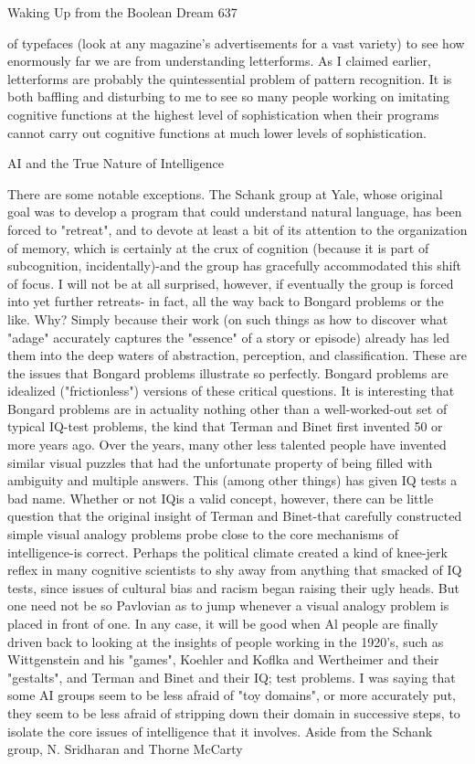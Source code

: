 Waking Up from the Boolean Dream                                                    637

of typefaces (look at any magazine's advertisements for a vast variety) to see how
enormously far we are from understanding letterforms. As I claimed earlier,
letterforms are probably the quintessential problem of pattern recognition. It is both
baffling and disturbing to me to see so many people working on imitating cognitive
functions at the highest level of sophistication when their programs cannot carry out
cognitive functions at much lower levels of sophistication.

                       AI and the True Nature of Intelligence

         There are some notable exceptions. The Schank group at Yale, whose original
goal was to develop a program that could understand natural language, has been
forced to "retreat", and to devote at least a bit of its attention to the organization of
memory, which is certainly at the crux of cognition (because it is part of subcognition,
incidentally)-and the group has gracefully accommodated this shift of focus. I will not
be at all surprised, however, if eventually the group is forced into yet further retreats-
in fact, all the way back to Bongard problems or the like. Why? Simply because their
work (on such things as how to discover what "adage" accurately captures the
"essence" of a story or episode) already has led them into the deep waters of
abstraction, perception, and classification. These are the issues that Bongard problems
illustrate so perfectly. Bongard problems are idealized ("frictionless") versions of
these critical questions.
         It is interesting that Bongard problems are in actuality nothing other than a
well-worked-out set of typical IQ-test problems, the kind that Terman and Binet first
invented 50 or more years ago. Over the years, many other less talented people have
invented similar visual puzzles that had the unfortunate property of being filled with
ambiguity and multiple answers. This (among other things) has given IQ tests a bad
name. Whether or not IQis a valid concept, however, there can be little question that
the original insight of Terman and Binet-that carefully constructed simple visual
analogy problems probe close to the core mechanisms of intelligence-is correct.
Perhaps the political climate created a kind of knee-jerk reflex in many cognitive
scientists to shy away from anything that smacked of IQ tests, since issues of cultural
bias and racism began raising their ugly heads. But one need not be so Pavlovian as to
jump whenever a visual analogy problem is placed in front of one. In any case, it will
be good when Al people are finally driven back to looking at the insights of people
working in the 1920's, such as Wittgenstein and his "games", Koehler and Koflka and
Wertheimer and their "gestalts", and Terman and Binet and their IQ; test problems.
         I was saying that some AI groups seem to be less afraid of "toy domains", or
more accurately put, they seem to be less afraid of stripping down their domain in
successive steps, to isolate the core issues of intelligence that it involves. Aside from
the Schank group, N. Sridharan and Thorne McCarty




